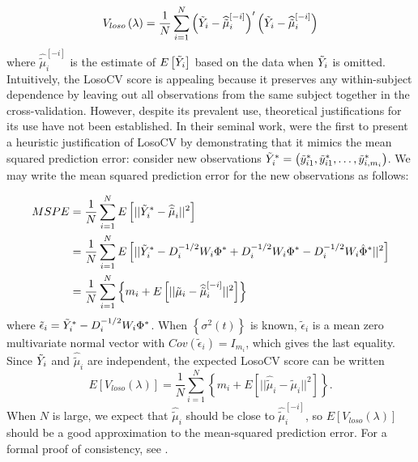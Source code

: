 \begin{equation} \label{eq:LOSOCV}
V_{loso}\left(\lambda\right) = \frac{1}{N}\sum_{i=1}^N \left( \tilde{Y}_i - \widehat{\tilde{\mu}}^{\left[-i\right]}_{i}\right)'\left( \tilde{Y}_i -  \widehat{\tilde{\mu}}^{\left[-i\right]}_{i}\right)
\end{equation}
\noindent
where $\widehat{\tilde{\mu}}^{\left[-i\right]}_{i}$ is the estimate of $E\left[ \tilde{Y}_i \right]$ based on the data when $\tilde{Y}_i$ is omitted. Intuitively, the LosoCV score is appealing because it preserves any within-subject dependence by leaving out all observations from the same subject together in the cross-validation.  However, despite its prevalent use, theoretical justifications for its use have not been established. In their seminal work, \cite{rice1991estimating} were the first to present a heuristic justification of LosoCV by demonstrating that it mimics the mean squared prediction error: consider new observations $\tilde{Y}^*_i = \left(\tilde{y}_{i1}^*, \tilde{y}_{i1}^*, \dots, \tilde{y}_{i, m_i}^*\right)$. We may write the mean squared prediction error for the new observations as follows:  
\bigskip 

\begin{align}
\begin{split}\label{eq:MSPE}
MSPE &= \frac{1}{N}\sum_{i=1}^N E\left[ \vert \vert \tilde{Y}^*_i - \widehat{\tilde{\mu}}_{i} \vert \vert^2 \right]\\
&=  \frac{1}{N}\sum_{i=1}^N E\left[ \vert \vert \tilde{Y}^*_i - D_i^{-1/2}W_i \Phi^* + D_i^{-1/2}W_i \Phi^* - D_i^{-1/2}W_i \hat{\Phi}^*\vert \vert^2 \right]\\
&=  \frac{1}{N}\sum_{i=1}^N \left\{m_i + E\left[ \vert \vert \tilde{\mu}_{i} - \widehat{\tilde{\mu}}^{\left[ -i \right]}_{i} \vert \vert^2 \right] \right\}
\end{split}
\end{align}
\noindent
where $\tilde{\epsilon}_i = \tilde{Y}^*_i - D_i^{-1/2}W_i \Phi^*$. When $\left\{ \sigma^2\left(t\right)\right\}$ is known, $\tilde{\epsilon}_i$ is a mean zero multivariate normal vector with $Cov\left(\tilde{\epsilon}_i\right) = I_{m_i}$, which gives the last equality. Since $\tilde{Y}_i$ and $ \widehat{\tilde{\mu}}_{i} $ are independent, the expected LosoCV score can be written
\begin{equation} \label{eq:MSPE_LOSOCV}
E\left[V_{loso}\left(\lambda\right) \right] =  \frac{1}{N}\sum_{i=1}^N\left\{ m_i +  E\left[ \vert \vert \widehat{\tilde{\mu}}_{i} - \tilde{\mu}_{i} \vert \vert^2 \right] \right\}. 
\end{equation}
\noindent
When $N$ is large, we expect that $\widehat{\tilde{\mu}}_{i}$ should be close to $\widehat{\tilde{\mu}}^{\left[ -i \right]}_{i}$, so $E\left[V_{loso}\left(\lambda\right) \right]$ should be a good approximation to the mean-squared prediction error. For a formal proof of consistency, see \cite{xu2012asymptotic}.


